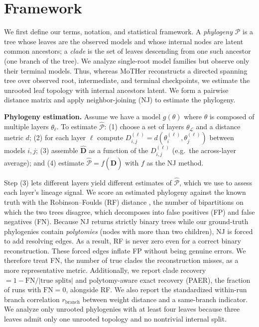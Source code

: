 \documentclass{article}
\theoremstyle{definition}
\theoremstyle{plain}
\begin{document}
\section{Framework}
\label{sec:framework}

We first define our terms, notation, and statistical framework. A \emph{phylogeny} $\mathcal{P}$ is a tree
whose leaves are the observed models and whose internal nodes are latent common ancestors; a
\emph{clade} is the set of leaves descending from one such ancestor (one branch of the tree). We analyze
single-root model families but observe only their terminal models. Thus, whereas MoTHer
\citep{horwitz2025mother} reconstructs a directed spanning tree over observed root, intermediate, and
terminal checkpoints, we estimate the unrooted leaf topology with internal ancestors latent. We form a pairwise distance matrix and apply neighbor-joining (NJ)
\citep{saitou1987neighbor} to estimate the phylogeny.

\textbf{Phylogeny estimation.}\label{sec:framework:phylo}
Assume we have a model $g(\theta)$ where $\theta$ is composed of multiple layers $\theta_\ell$. To estimate $\widehat{\mathcal{P}}$: (1) choose a set of layers $\theta_\mathcal{L}$ and a distance metric $d$;
(2) for each layer $\ell$ compute $D_{i,j}^{(\ell)} = d(\theta^{(\ell)}_i, \theta^{(\ell)}_j)$ between models
$i,j$; (3) assemble $\widehat{\mathbf{D}}$ as a function of the $D_{i,j}^{(\ell)}$ (e.g.\ the across-layer
average); and (4) estimate $\widehat{\mathcal{P}} = f(\widehat{\mathbf{D}})$ with $f$ as the NJ method.

Step (3) lets different layers yield different estimates of $\widehat{\mathcal{P}}$, which we use to
assess each layer's lineage signal. We score an estimated phylogeny against the known truth with the
Robinson--Foulds (RF) distance \citep{robinson1981comparison}, the number of bipartitions on which the
two trees disagree, which decomposes into false positives (FP) and false negatives (FN). Because NJ
returns strictly binary trees while our ground-truth phylogenies contain \textit{polytomies} (nodes with
more than two children), NJ is forced to add resolving edges. As a result, RF is never zero even for a correct binary
reconstruction. These forced edges inflate FP without being genuine errors. We therefore treat FN, the
number of true clades the reconstruction misses, as a more representative metric. Additionally, we report clade
recovery $= 1 - \mathrm{FN}/|\text{true splits}|$ and polytomy-aware exact recovery (PAER), the fraction of
runs with $\mathrm{FN}=0$, alongside RF. We also report the standardized within-run branch correlation
$r_{\mathrm{branch}}$ between weight distance and a same-branch indicator. We analyze only unrooted
phylogenies with at least four leaves because three leaves admit only one unrooted topology and no
nontrivial internal split.
\end{document}
